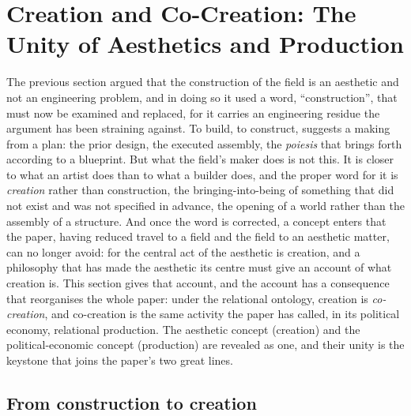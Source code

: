 \section{Creation and Co-Creation: The Unity of Aesthetics and Production}
\label{p21:sec:creation}

\noindent
The previous section argued that the construction of the field is an aesthetic and not an engineering problem, and in doing so it used a word, ``construction'', that must now be examined and replaced, for it carries an engineering residue the argument has been straining against. To build, to construct, suggests a making from a plan: the prior design, the executed assembly, the \emph{poiesis} that brings forth according to a blueprint. But what the field's maker does is not this. It is closer to what an artist does than to what a builder does, and the proper word for it is \emph{creation} rather than construction, the bringing-into-being of something that did not exist and was not specified in advance, the opening of a world rather than the assembly of a structure. And once the word is corrected, a concept enters that the paper, having reduced travel to a field and the field to an aesthetic matter, can no longer avoid: for the central act of the aesthetic is creation, and a philosophy that has made the aesthetic its centre must give an account of what creation is. This section gives that account, and the account has a consequence that reorganises the whole paper: under the relational ontology, creation is \emph{co-creation}, and co-creation is the same activity the paper has called, in its political economy, relational production. The aesthetic concept (creation) and the political-economic concept (production) are revealed as one, and their unity is the keystone that joins the paper's two great lines.

\subsection{From construction to creation}
\label{p21:sub:cr-fromconstruction}

